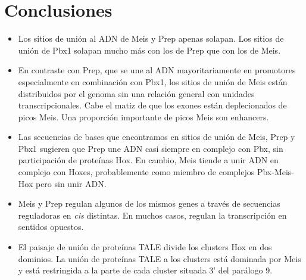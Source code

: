 \chapter{Conclusiones}
\begin{itemize}

  \item Los sitios de unión al ADN de Meis y Prep apenas solapan. Los sitios de unión de Pbx1 solapan mucho más con los de Prep que con los de Meis.  %
  
  \item En contraste con Prep, que se une al ADN mayoritariamente en promotores especialmente en combinación con Pbx1, los sitios de unión de Meis están distribuidos por el genoma sin una relación general con unidades transcripcionales. Cabe el matiz de que los exones están deplecionados de picos Meis. Una proporción importante de picos Meis son enhancers. %
  
  \item Las secuencias de bases que encontramos en sitios de unión de Meis, Prep y Pbx1 sugieren que Prep une ADN casi siempre en complejo con Pbx, sin participación de proteínas Hox. En cambio, Meis tiende a unir ADN en complejo con Hoxes, probablemente como miembro de complejos Pbx-Meis-Hox pero sin unir ADN. %
    
  \item Meis y Prep regulan algunos de los mismos genes a través de secuencias reguladoras en \textit{cis} distintas. En muchos casos, regulan la transcripción en sentidos opuestos. %
  
  \item El paisaje de unión de proteínas \ac{TALE} divide los clusters Hox en dos dominios. La unión de proteínas \ac{TALE} a los clusters está dominada por Meis y está restringida a la parte de cada cluster situada 3' del parálogo 9.%
  

\end{itemize}
